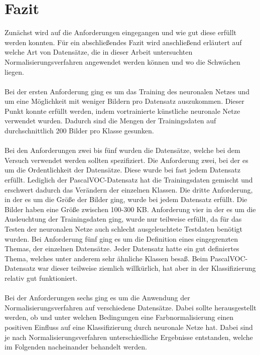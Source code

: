 \chapter{Fazit}\label{s.fazit}
Zunächst wird auf die Anforderungen eingegangen und wie gut diese erfüllt werden konnten. Für ein abschließendes Fazit wird anschließend erläutert auf welche Art von Datensätze, die in dieser Arbeit untersuchten Normalisierungsverfahren angewendet werden können und wo die Schwächen liegen.\\\\
Bei der ersten Anforderung ging es um das Training des neuronalen Netzes und um eine Möglichkeit mit weniger Bildern pro Datensatz auszukommen. Dieser Punkt konnte erfüllt werden, indem vortrainierte künstliche neuronale Netze verwendet wurden. Dadurch sind die Mengen der Trainingsdaten auf durchschnittlich 200 Bilder pro Klasse gesunken.\\\\
Bei den Anforderungen zwei bis fünf wurden die Datensätze, welche bei dem Versuch verwendet werden sollten spezifiziert. Die Anforderung zwei, bei der es um die Ordentlichkeit der Datensätze. Diese wurde bei fast jedem Datensatz erfüllt. Lediglich der PascalVOC-Datensatz hat die Trainingsdaten gemischt und erschwert dadurch das Verändern der einzelnen Klassen. Die dritte Anforderung, in der es um die Größe der Bilder ging, wurde bei jedem Datensatz erfüllt. Die Bilder haben eine Größe zwischen 100-300 KB. Anforderung vier in der es um die Ausleuchtung der Trainingsdaten ging, wurde nur teilweise erfüllt, da für das Testen der neuronalen Netze auch schlecht ausgeleuchtete Testdaten benötigt wurden. Bei Anforderung fünf ging es um die Definition eines eingegrenzten Themas, der einzelnen Datensätze. Jeder Datensatz hatte ein gut definiertes Thema, welches unter anderem sehr ähnliche Klassen besaß. Beim PascalVOC-Datensatz war dieser teilweise ziemlich willkürlich, hat aber in der Klassifizierung relativ gut funktioniert.\\\\
Bei der Anforderungen sechs ging es um die Anwendung der Normalisierungsverfahren auf verschiedene Datensätze. Dabei sollte herausgestellt werden, ob und unter welchen Bedingungen eine Farbnormalisierung einen positiven Einfluss auf eine Klassifizierung durch neuronale Netze hat. Dabei sind je nach Normalisierungsverfahren unterschiedliche Ergebnisse entstanden, welche im Folgenden nacheinander behandelt werden.\\\\
